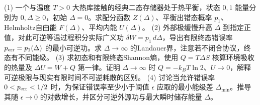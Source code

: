 (1) 一个与温度 \(T>0\) 大热库接触的经典二态存储器处于热平衡，状态 \(0,1\) 能量分别为 \(0,\Delta\ge0\)，初始 \(\Delta=0\)。求配分函数 \(Z(\Delta)\)、平衡出错态概率 \(p_1\)、Helmholtz自由能 \(F(\Delta)\)、平均内能 \(U(\Delta)\)。
(2) 外部极缓慢升高 \(\Delta\) 到指定正值，对此可逆等温过程积分实际广义功 \(\delta W=p_1\,d\Delta\)，导出有限终态错误率 \(p_{\rm err}=p_1(\Delta)\) 的最小可逆功。求 \(\Delta\to\infty\) 的Landauer界，注意若不闭合协议，终态有不同能级。
(3) 求初态和有限终态Shannon熵，使用 \(Q=T\Delta S\) 核算环境吸收的热量及 \(\Delta U=W+Q\) 第一律。证明 \(\Delta\to\infty\) 时 \(Q=-k_BT\ln2\)、\(U\to0\)，解释可逆极限与现实有限时间不可逆耗散的区别。
(4) 讨论当允许错误率 \(0<p_{\rm err}<1/2\) 时，为保证错误率至少小于阈值 \(\epsilon\) 应取的最小能级差 \(\Delta_{\min}\)。推导其随 \(\epsilon\to0\) 的对数增长，并区分可逆外源功与最大瞬时储存能量 \(\Delta\)。
